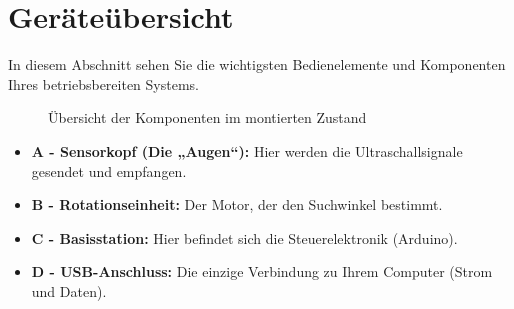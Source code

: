 %
%

\chapter{Geräteübersicht}
In diesem Abschnitt sehen Sie die wichtigsten Bedienelemente und Komponenten Ihres betriebsbereiten Systems.

\begin{figure}[h]
	\centering
	\caption{Übersicht der Komponenten im montierten Zustand}
\end{figure}

\begin{itemize}
	\item \textbf{A - Sensorkopf (Die „Augen“):} Hier werden die Ultraschallsignale gesendet und empfangen.
	\item \textbf{B - Rotationseinheit:} Der Motor, der den Suchwinkel bestimmt.
	\item \textbf{C - Basisstation:} Hier befindet sich die Steuerelektronik (Arduino).
	\item \textbf{D - USB-Anschluss:} Die einzige Verbindung zu Ihrem Computer (Strom und Daten).
\end{itemize}
